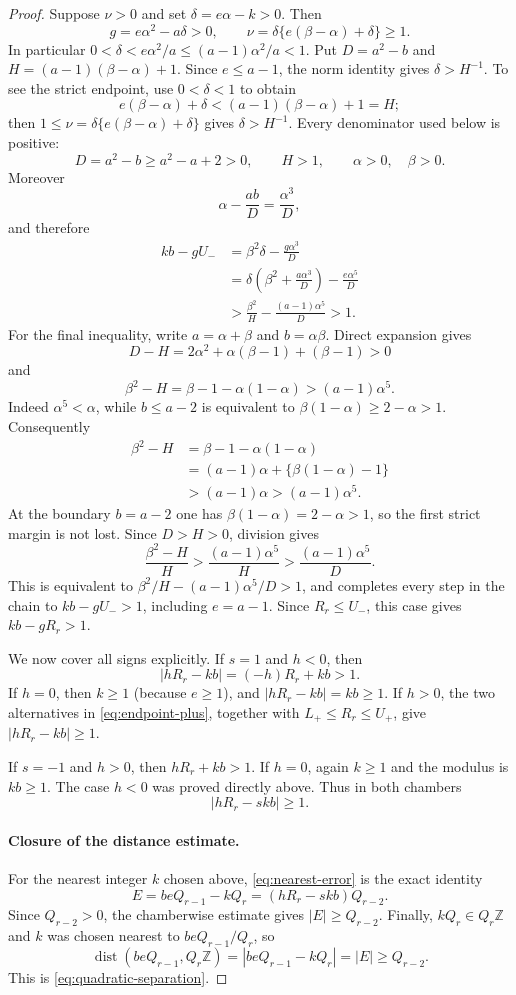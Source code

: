 \begin{proof}
Suppose $\nu>0$ and set $\delta=e\alpha-k>0$.  Then
\[
g=e\alpha^2-a\delta>0,
\qquad
\nu=\delta\{e(\beta-\alpha)+\delta\}\ge1.
\]
In particular
$0<\delta<e\alpha^2/a\le(a-1)\alpha^2/a<1$.  Put $D=a^2-b$ and
$H=(a-1)(\beta-\alpha)+1$.  Since $e\le a-1$, the norm identity gives
$\delta>H^{-1}$.  To see the strict endpoint, use $0<\delta<1$ to obtain
\[
e(\beta-\alpha)+\delta
<(a-1)(\beta-\alpha)+1=H;
\]
then $1\le\nu=\delta\{e(\beta-\alpha)+\delta\}$ gives
$\delta>H^{-1}$.  Every denominator used below is positive:
\[
D=a^2-b\ge a^2-a+2>0,
\qquad H>1,
\qquad \alpha>0,\quad \beta>0.
\]
Moreover
\[
\alpha-\frac{ab}{D}=\frac{\alpha^3}{D},
\]
and therefore
\begin{align*}
kb-gU_-
&=\beta^2\delta-\frac{g\alpha^3}{D}\\
&=\delta\left(\beta^2+\frac{a\alpha^3}{D}\right)
  -\frac{e\alpha^5}{D}\\
&>\frac{\beta^2}{H}-\frac{(a-1)\alpha^5}{D}>1.
\end{align*}
For the final inequality, write $a=\alpha+\beta$ and $b=\alpha\beta$.
Direct expansion gives
\[
D-H=2\alpha^2+\alpha(\beta-1)+(\beta-1)>0
\]
and
\[
\beta^2-H=\beta-1-\alpha(1-\alpha)>(a-1)\alpha^5.
\]
Indeed $\alpha^5<\alpha$, while $b\le a-2$ is equivalent to
$\beta(1-\alpha)\ge2-\alpha>1$.  Consequently
\begin{align*}
\beta^2-H
&=\beta-1-\alpha(1-\alpha)\\
&=(a-1)\alpha+\{\beta(1-\alpha)-1\}\\
&>(a-1)\alpha>(a-1)\alpha^5.
\end{align*}
At the boundary $b=a-2$ one has
$\beta(1-\alpha)=2-\alpha>1$, so the first strict margin is not lost.
Since $D>H>0$, division gives
\[
\frac{\beta^2-H}{H}
>\frac{(a-1)\alpha^5}{H}
>\frac{(a-1)\alpha^5}{D}.
\]
This is equivalent to
$\beta^2/H-(a-1)\alpha^5/D>1$, and completes every step in the chain
to $kb-gU_->1$, including $e=a-1$.  Since $R_r\le U_-$, this case gives
$kb-gR_r>1$.

We now cover all signs explicitly.  If $s=1$ and $h<0$, then
\[
|hR_r-kb|=(-h)R_r+kb>1.
\]
If $h=0$, then $k\ge1$ (because $e\ge1$), and
$|hR_r-kb|=kb\ge1$.  If $h>0$, the two alternatives in
\eqref{eq:endpoint-plus}, together with
$L_+\le R_r\le U_+$, give $|hR_r-kb|\ge1$.

If $s=-1$ and $h>0$, then $hR_r+kb>1$.  If $h=0$, again $k\ge1$ and the
modulus is $kb\ge1$.  The case $h<0$ was proved directly above.
Thus in both chambers
\[
|hR_r-skb|\ge1.
\]

\paragraph{Closure of the distance estimate.}
For the nearest integer $k$ chosen above, \eqref{eq:nearest-error} is the
exact identity
\[
E=beQ_{r-1}-kQ_r=(hR_r-skb)Q_{r-2}.
\]
Since $Q_{r-2}>0$, the chamberwise estimate gives $|E|\ge Q_{r-2}$.
Finally, $kQ_r\in Q_r\mathbb Z$ and $k$ was chosen nearest to
$beQ_{r-1}/Q_r$, so
\[
\operatorname{dist}(beQ_{r-1},Q_r\mathbb Z)
=|beQ_{r-1}-kQ_r|=|E|\ge Q_{r-2}.
\]
This is \eqref{eq:quadratic-separation}.
\end{proof}

